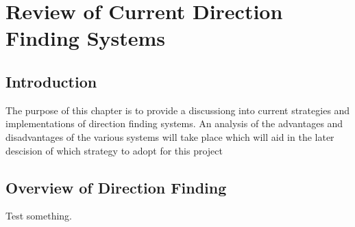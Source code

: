 \chapter{Review of Current Direction Finding Systems}

\section{Introduction}
The purpose of this chapter is to provide a discussiong into current strategies and implementations of direction finding systems. An analysis of the advantages and disadvantages of the various systems will take place which will aid in the later descision of which strategy to adopt for this project

\section{Overview of Direction Finding}
Test \cite{roy1986direction} something.
